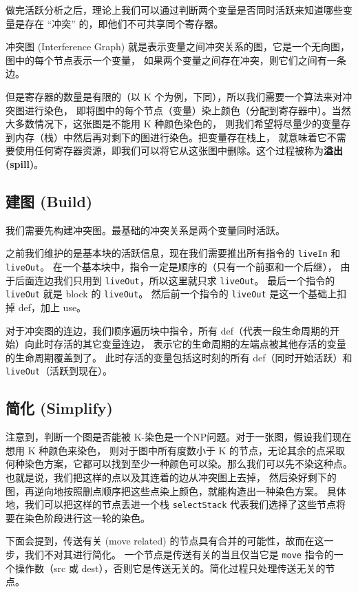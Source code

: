 做完活跃分析之后，理论上我们可以通过判断两个变量是否同时活跃来知道哪些变量是存在 “冲突”
的，即他们不可共享同个寄存器。

冲突图 (Interference Graph) 就是表示变量之间冲突关系的图，它是一个无向图，图中的每个节点表示一个变量，
如果两个变量之间存在冲突，则它们之间有一条边。

但是寄存器的数量是有限的（以 K 个为例，下同），所以我们需要一个算法来对冲突图进行染色，
即将图中的每个节点（变量）染上颜色（分配到寄存器中）。当然大多数情况下，这张图是不能用 K 种颜色染色的，
则我们希望将尽量少的变量存到内存（栈）中然后再对剩下的图进行染色。把变量存在栈上，
就意味着它不需要使用任何寄存器资源，即我们可以将它从这张图中删除。这个过程被称为\textbf{溢出 (spill)}。

\subsection{建图 (Build)}

我们需要先构建冲突图。最基础的冲突关系是两个变量同时活跃。

之前我们维护的是基本块的活跃信息，现在我们需要推出所有指令的 \texttt{liveIn} 和 \texttt{liveOut}。
在一个基本块中，指令一定是顺序的（只有一个前驱和一个后继），
由于后面连边我们只用到 \texttt{liveOut}，所以这里就只求 \texttt{liveOut}。
最后一个指令的 \texttt{liveOut} 就是 block 的 \texttt{liveOut}。
然后前一个指令的 \texttt{liveOut} 是这一个基础上扣掉 def，加上 use。

对于冲突图的连边，我们顺序遍历块中指令，所有 def（代表一段生命周期的开始）向此时存活的其它变量连边，
表示它的生命周期的左端点被其他存活的变量的生命周期覆盖到了。
此时存活的变量包括这时刻的所有 def（同时开始活跃）和 \texttt{liveOut}（活跃到现在）。

\subsection{简化 (Simplify)}

注意到，判断一个图是否能被 K-染色是一个NP问题。对于一张图，假设我们现在想用 K 种颜色来染色，
则对于图中所有度数小于 K 的节点，无论其余的点采取何种染色方案，它都可以找到至少一种颜色可以染。那么我们可以先不染这种点。
也就是说，我们把这样的点以及其连着的边从冲突图上去掉，
然后染好剩下的图，再逆向地按照删点顺序把这些点染上颜色，就能构造出一种染色方案。
具体地，我们可以把这样的节点丢进一个栈 \texttt{selectStack} 代表我们选择了这些节点将要在染色阶段进行这一轮的染色。

下面会提到，传送有关 (move related) 的节点具有合并的可能性，故而在这一步，我们不对其进行简化。
一个节点是传送有关的当且仅当它是 \texttt{move} 指令的一个操作数（src 或 dest），否则它是传送无关的。简化过程只处理传送无关的节点。

